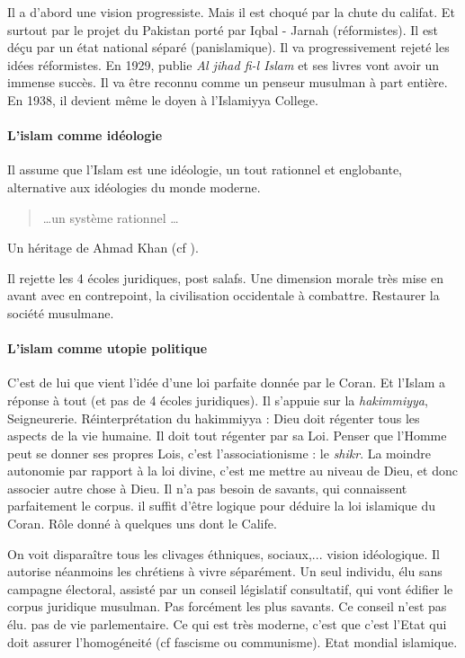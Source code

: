 Il a d'abord une vision progressiste. Mais il est choqué par la chute du califat. Et surtout par le projet du Pakistan porté par Iqbal - Jarnah (réformistes). Il est déçu par un état national séparé (panislamique). Il va progressivement rejeté les idées réformistes. En 1929, publie \textit{Al jihad fi-l Islam} et ses livres vont avoir un immense succès. Il va être reconnu comme un penseur musulman à part entière. En 1938, il devient même le doyen à l'Islamiyya College.



\paragraph{L'islam comme idéologie} Il assume que l'Islam est une idéologie, un tout rationnel et englobante, alternative aux idéologies du monde moderne. \begin{quote}
    \ldots un système rationnel \ldots
\end{quote}
Un héritage de Ahmad Khan (cf \pageref{Theol:AhmadKhan}).

Il rejette les 4 écoles juridiques, post salafs. Une dimension morale très mise en avant avec en contrepoint, la civilisation occidentale à combattre. Restaurer la société musulmane. 


\paragraph{L'islam comme utopie politique} C'est de lui que vient l'idée d'une loi parfaite donnée par le Coran. Et l'Islam a réponse à tout (et pas de 4 écoles juridiques). Il s'appuie sur la \emph{hakimmiyya}, Seigneurerie. Réinterprétation du hakimmiyya : Dieu doit régenter tous les aspects de la vie humaine. Il doit tout régenter par sa Loi. Penser que l'Homme peut se donner ses propres Lois, c'est l'associationisme : le \emph{shikr}. La moindre autonomie par rapport à la loi divine, c'est me mettre au niveau de Dieu, et donc associer autre chose à Dieu.
Il n'a pas besoin de savants, qui connaissent parfaitement le corpus. il suffit d'être logique pour déduire la loi islamique du Coran. Rôle donné à quelques uns dont le Calife.

On voit disparaître tous les clivages éthniques, sociaux,... vision idéologique. Il autorise néanmoins les chrétiens à vivre séparément.
Un seul individu, élu sans campagne électoral, assisté par un conseil législatif consultatif, qui vont édifier le corpus juridique musulman. Pas forcément les plus savants. Ce conseil n'est pas élu. pas de vie parlementaire.  Ce qui est très moderne, c'est que c'est l'Etat qui doit assurer l'homogéneité (cf fascisme ou communisme).
Etat mondial islamique.


